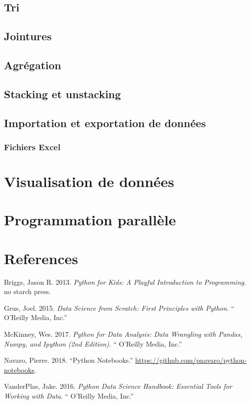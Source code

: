 \documentclass[12pt,]{book}
\numberwithin{equation}{section}
\numberwithin{countremarque}{section}
\begin{document}
\section{Tri}\label{tri-2}

\section{Jointures}\label{jointures}

\section{Agrégation}\label{agregation}

\section{Stacking et unstacking}\label{stacking-et-unstacking}

\section{Importation et exportation de
données}\label{importation-et-exportation-de-donnees}

\subsection{Fichiers Excel}\label{pandas-importation-excel}

\chapter{Visualisation de données}\label{visualisation-de-donnees}

\chapter{Programmation parallèle}\label{programmation-parallele}

\chapter{References}\label{references}

\hypertarget{refs}{}
\hypertarget{ref-briggs_2013_python}{}
Briggs, Jason R. 2013. \emph{Python for Kids: A Playful Introduction to
Programming}. no starch press.

\hypertarget{ref-grus_2015_data}{}
Grus, Joel. 2015. \emph{Data Science from Scratch: First Principles with
Python}. `` O'Reilly Media, Inc.''

\hypertarget{ref-mckinney_2017_python}{}
McKinney, Wes. 2017. \emph{Python for Data Analysis: Data Wrangling with
Pandas, Numpy, and Ipython (2nd Edition)}. `` O'Reilly Media, Inc.''

\hypertarget{ref-navaro_python}{}
Navaro, Pierre. 2018. ``Python Notebooks.''
\url{https://github.com/pnavaro/python-notebooks}.

\hypertarget{ref-vanderplas2016python}{}
VanderPlas, Jake. 2016. \emph{Python Data Science Handbook: Essential
Tools for Working with Data}. `` O'Reilly Media, Inc.''
\end{document}
